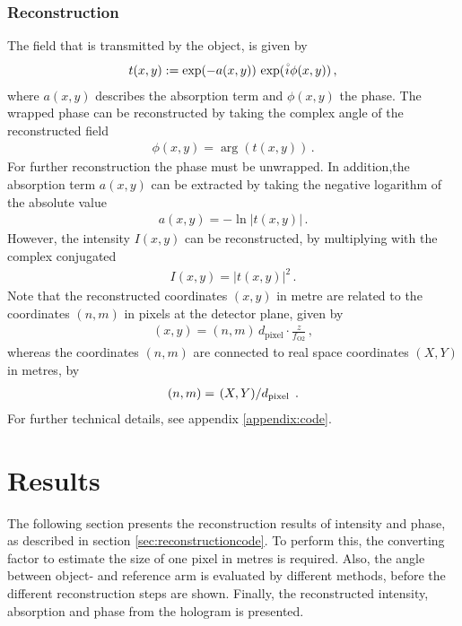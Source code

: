 \documentclass{article}
\newcommand{\ima}[0]{\overset{\hspace{0.5mm}\text{\scalebox{0.7}{$\circ$}}}{\imath}}
\begin{document}
\subsubsection{Reconstruction} \label{subsub:reconstruction}
The field that is transmitted by the object, is given by
\begin{align}
    t(x,y):=\exp(-a(x,y))\,\exp(\ima\phi(x,y))\,, \label{eq:field2}
\end{align}
where $a(x,y)$ describes the absorption term and $\phi(x,y)$ the phase. The wrapped phase can be reconstructed by taking the complex angle of the reconstructed field
\begin{align}
    \phi(x,y)=\arg \left( t(x,y)\right)\,. \label{form:phase}
\end{align}
For further reconstruction the phase must be unwrapped.
In addition,the absorption term $a(x,y)$ can be extracted by taking the negative logarithm of the absolute value
\begin{align}
    a(x,y) = -\ln\left| t(x,y) \right|\,. \label{form:absorp}
\end{align}
However, the intensity $I(x,y)$ can be reconstructed, by multiplying with the complex conjugated
\begin{align}
    I(x,y)=\left| t(x,y)\right|^2\,. \label{form:intensity}
\end{align}
Note that the reconstructed coordinates $(x,y)$ in metre are related to the coordinates $(n,m)$ in pixels at the detector plane, given by
\begin{align}
    (x,y)=(n,m)\,d_\text{pixel}\cdot \frac{z}{f_\text{O2}}\,,
\end{align}
whereas the coordinates $(n,m)$ are connected to real space coordinates $(X,Y)$ in metres, by
\begin{align}
    (n,m)=\left. (X,Y) \middle/ d_\text{pixel} \right.\,.
\end{align}
For further technical details, see appendix \ref{appendix:code}.

\section{Results}
The following section presents the reconstruction results of intensity and phase, as described in section \ref{sec:reconstructioncode}. To perform this, the converting factor to estimate the size of one pixel in metres is required. Also, the angle between object- and reference arm is evaluated by different methods, before the different reconstruction steps are shown. Finally, the reconstructed intensity, absorption and phase from the hologram is presented.
\end{document}
